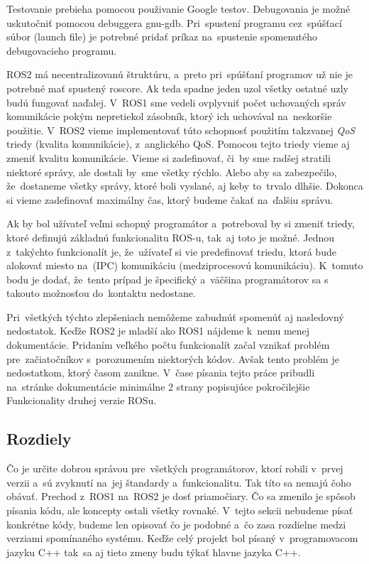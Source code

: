 Testovanie prebieha pomocou použivanie Google testov. Debugovania je možné uskutočniť pomocou debuggera gnu-gdb. Pri~spustení programu
cez~spúšťací súbor (launch file) je potrebné pridať príkaz na~spustenie spomenutého debugovacieho programu.

ROS2 má necentralizovanú štruktúru, a~preto pri~spúšťaní programov už nie je potrebné mať spustený roscore. Ak teda spadne jeden uzol všetky
ostatné uzly budú fungovať naďalej. V~ROS1 sme vedeli ovplyvniť počet uchovaných správ komunikácie pokým nepretiekol zásobník, ktorý ich uchovával
na~neskoršie použitie. V~ROS2 vieme implementovať túto schopnosť použitím takzvanej \textit{QoS} triedy (kvalita komunikácie), z~anglického \acrlong{QoS}.
Pomocou tejto triedy vieme aj zmeniť kvalitu komunikácie. Vieme si zadefinovať, či~by sme radšej stratili niektoré správy, ale dostali by~sme
všetky rýchlo. Alebo aby sa zabezpečilo, že~dostaneme všetky správy, ktoré boli vyslané, aj keby to~trvalo dlhšie. Dokonca si vieme zadefinovať
maximálny čas, ktorý budeme čakať na~ďalšiu správu.

Ak by bol užívateľ veľmi schopný programátor a~potreboval by si zmeniť triedy, ktoré definujú základnú funkcionalitu ROS-u, tak~aj toto je možné.
Jednou z~takýchto funkcionalít je, že~užívateľ si vie predefinovať triedu, ktorá bude alokovať miesto na~(IPC) komunikáciu (medziprocesovú komunikáciu).
K~tomuto bodu je dodať, že~tento prípad je špecifický a~väčšina programátorov sa s takouto možnosťou do~kontaktu nedostane.

Pri~všetkých týchto zlepšeniach nemôžeme zabudnúť spomenúť aj nasledovný nedostatok. Keďže ROS2 je mladší ako ROS1 nájdeme k~nemu menej dokumentácie.
Pridaním veľkého počtu funkcionalít začal vznikať problém pre~začiatočníkov s~porozumením niektorých kódov. Avšak tento problém je nedostatkom,
ktorý časom zanikne. V~čase písania tejto práce pribudli na~stránke dokumentácie minimálne 2 strany popisujúce pokročilejšie Funkcionality druhej
verzie ROSu.

\subsection{Rozdiely}

Čo je určite dobrou správou pre~všetkých programátorov, ktorí robili v~prvej verzii a~sú zvyknutí na~jej štandardy a~funkcionalitu. Tak títo
sa nemajú čoho obávať. Prechod z~ROS1 na~ROS2 je dosť priamočiary. Čo sa zmenilo je spôsob písania kódu, ale koncepty ostali všetky rovnaké.
V~tejto sekcii nebudeme písať konkrétne kódy, budeme len opisovať čo je podobné a~čo zasa rozdielne medzi verziami spomínaného systému. Keďže
celý projekt bol písaný v~programovacom jazyku C++ tak~sa aj tieto zmeny budu týkať hlavne jazyka C++.

